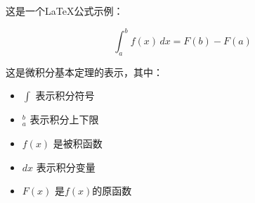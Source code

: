\documentclass{article}
\begin{document}
这是一个LaTeX公式示例：

\[
\int_{a}^{b} f(x) \, dx = F(b) - F(a)
\]

这是微积分基本定理的表示，其中：
\begin{itemize}
    \item $\int$ 表示积分符号
    \item $_{a}^{b}$ 表示积分上下限
    \item $f(x)$ 是被积函数
    \item $dx$ 表示积分变量
    \item $F(x)$ 是$f(x)$的原函数
\end{itemize}
\end{document}
